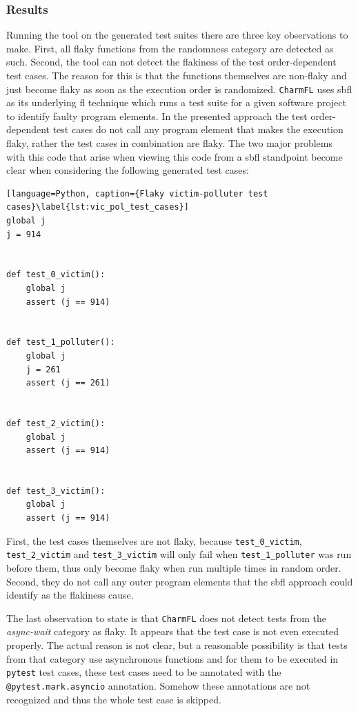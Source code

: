 \documentclass[
fancyheadings, %
%
%
]{stsreprt}
\begin{document}
\subsubsection{Results}
Running the tool on the generated test suites there are three key observations to make. 
First, all flaky functions from the randomness category are detected as such. 
Second, the tool can not detect the flakiness of the test order-dependent test cases. The reason for this is that the functions themselves are non-flaky and just become flaky as soon as the execution order is randomized. 
\texttt{CharmFL} uses \acrshort{sbfl} as its underlying \acrshort{fl} technique which runs a test suite for a given software project to identify faulty program elements. 
In the presented approach the test order-dependent test cases do not call any program element that makes the execution flaky, rather the test cases in combination are flaky.
The two major problems with this code that arise when viewing this code from a \acrshort{sbfl} standpoint become clear when considering the following generated test cases:
\begin{lstlisting}[language=Python, caption={Flaky victim-polluter test cases}\label{lst:vic_pol_test_cases}]
global j
j = 914


def test_0_victim():
    global j
    assert (j == 914)


def test_1_polluter():
    global j
    j = 261
    assert (j == 261)


def test_2_victim():
    global j
    assert (j == 914)


def test_3_victim():
    global j
    assert (j == 914)
\end{lstlisting}
First, the test cases themselves are not flaky, because \lstinline{test_0_victim}, \lstinline{test_2_victim} and \lstinline{test_3_victim} will only fail when \lstinline{test_1_polluter} was run before them, thus only become flaky when run multiple times in random order. Second, they do not call any outer program elements that the \acrshort{sbfl} approach could identify as the flakiness cause. \par
The last observation to state is that \texttt{CharmFL} does not detect tests from the \textit{async-wait} category as flaky.
It appears that the test case is not even executed properly.
The actual reason is not clear, but a reasonable possibility is that tests from that category use asynchronous functions and for them to be executed in \texttt{pytest} test cases, these test cases need to be annotated with the \lstinline{@pytest.mark.asyncio} annotation.
Somehow these annotations are not recognized and thus the whole test case is skipped. 
\end{document}
